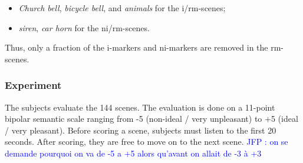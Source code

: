 \documentclass[preprint,12pt]{elsarticle}
\newcommand{\jfp}[1]{\textcolor{blue}{JFP : #1}}
\begin{document}

\begin{itemize}
\item \emph{Church bell}, \emph{bicycle bell}, and \emph{animals} for the i/rm-scenes;
\item \emph{siren}, \emph{car horn} for the ni/rm-scenes.
\end{itemize}


Thus, only a fraction of the i-markers and ni-markers are removed in the rm-scenes.

\subsubsection*{Experiment}




The subjects evaluate the 144 scenes. The evaluation is done on a 11-point bipolar semantic scale ranging from -5 (non-ideal / very unpleasant) to +5 (ideal / very pleasant). Before scoring a scene, subjects must listen to the first 20 seconds. After scoring, they are free to move on to the next scene. \jfp{on se demande pourquoi on va de -5 a +5 alors qu'avant on allait de -3 à +3}
\end{document}
